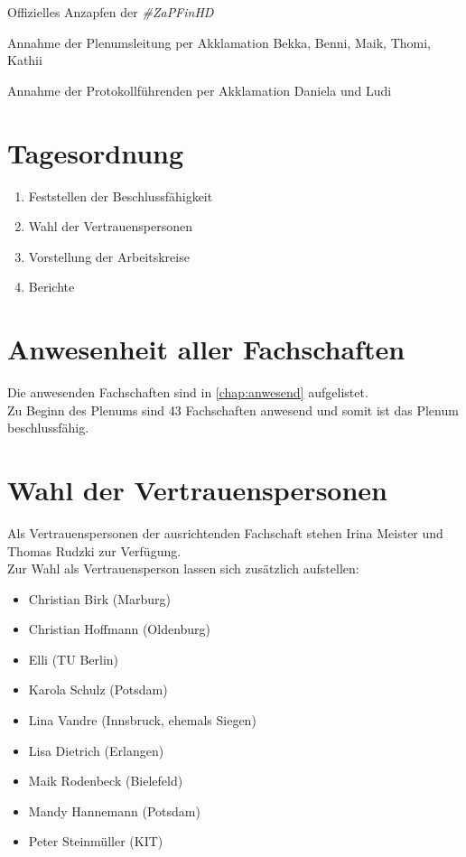   Offizielles Anzapfen der \textit{\#ZaPFinHD}

  \begin{success}{Annahme der Plenumsleitung per Akklamation}
    Bekka, Benni, Maik, Thomi, Kathii
  \end{success}

  \begin{success}{Annahme der Protokollführenden per Akklamation}
    Daniela und Ludi
  \end{success}

  \section{Tagesordnung}
    \begin{enumerate}
      \item Feststellen der Beschlussfähigkeit
      \item Wahl der Vertrauenspersonen
      \item Vorstellung der Arbeitskreise
      \item Berichte
    \end{enumerate}

\section{Anwesenheit aller Fachschaften}
  Die anwesenden Fachschaften sind in \autoref{chap:anwesend} aufgelistet. \\
  Zu Beginn des Plenums sind 43 Fachschaften anwesend und somit ist das Plenum beschlussfähig.

\section{Wahl der Vertrauenspersonen}

  Als Vertrauenspersonen der ausrichtenden Fachschaft stehen Irina Meister und Thomas Rudzki zur Verfügung. \\

  Zur Wahl als Vertrauensperson lassen sich zusätzlich aufstellen:
  \begin{itemize}
    \item Christian Birk (Marburg)
    \item Christian Hoffmann (Oldenburg)
    \item Elli (TU Berlin)
    \item Karola Schulz (Potsdam)
    \item Lina Vandre (Innsbruck, ehemals Siegen)
    \item Lisa Dietrich (Erlangen)
    \item Maik Rodenbeck (Bielefeld)
    \item Mandy Hannemann (Potsdam)
    \item Peter Steinmüller (KIT)
  \end{itemize}

